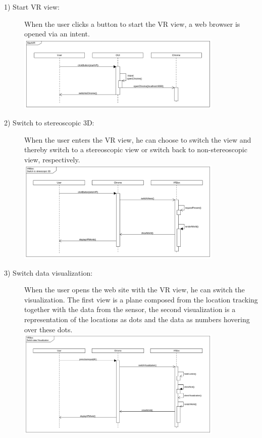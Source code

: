 \begin{description}
	\item[1) Start VR view:] When the user clicks a button to start the VR view, a web browser is opened via an intent.  \\
	\includegraphics[width=0.8\textwidth]{diagramms/startVR.png}

	\item[2) Switch to stereoscopic 3D: ] When the user enters the VR view, he can choose to switch the view and thereby switch to a stereoscopic view or switch back to non-stereoscopic view, respectively. \\
	\includegraphics[width=0.8\textwidth]{diagramms/stereo.png}

	\item[3) Switch data visualization: ] When the user opens the web site with the VR view, he  can switch the visualization. The first view is a plane composed from
  the location tracking together with the data from the sensor, the second visualization is a representation of the locations as dots
  and the data as numbers hovering over these dots.  \\
	\includegraphics[width=0.8\textwidth]{diagramms/switchVisual.png}


\end{description}
